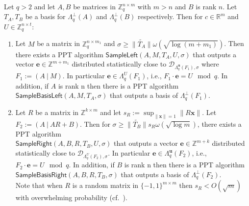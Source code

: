 \documentclass[runningheads,10pt]{llncs}
\def\ZZ{\mathbb{Z}}
\def\RR{\mathbb{R}}
\def\cal{\mathcal}
\def\bf{\mathbf}
\def\SampleLeft{\mathsf{SampleLeft}}
\def\SampleRight{\mathsf{SampleRight}}
\def\SampleBasisLeft{\mathsf{SampleBasisLeft}}
\def\SampleBasisRight{\mathsf{SampleBasisRight}}
\def\Pr{\mathrm{Pr}}
\def\u{\bf{u}}
\def\e{\bf{e}}
\def\x{\bf{x}}
\def\L{\Lambda}
\def\Lp{\Lambda^{\perp}}
\def\DuA{\cal{D}_{\L_q^{\u}(A),\sigma}}
\begin{document}
\begin{theorem}\label{thm:Gauss}
	Let $q> 2$ and let $A, B$ be matrices in $\ZZ_q^{n\times m}$ with $m>n$ and $B$ is rank $n$. Let $T_A, T_B$ be a basis for $\Lp_q(A)$ and  $\Lp_q(B)$ respectively.
	Then for $c\in\RR^m$ and $U\in\ZZ_q^{n\times t}$:
	\begin{enumerate}
		\item Let $M$ be a matrix in $\ZZ_q^{n\times m_1}$ and $\sigma\geq\|\widetilde{T_A}\|\omega(\sqrt{\log(m+m_1)})$. Then there exists a PPT algorithm $\SampleLeft(A,M,T_A,U,\sigma)$ that outputs a vector $\e\in\ZZ^{m+m_1}$ distributed statistically close to $\cal{D}_{\L_q^{\u}(F_1),\sigma}$ where $F_1:=(A~|~M)$. In particular $\e\in \L_q^{U}(F_1)$, i.e., $F_1\cdot\e=U\mod q$.
		In addition, if $A$ is rank n then there is a PPT algorithm $\SampleBasisLeft(A, M, T_A, \sigma)$ that outputs a basis of $\Lambda_q^\perp(F_1)$.\\
		
		\item Let $R$ be a matrix in $\ZZ^{k\times m}$ and let $s_R:=\sup_{\|\x\|=1}\|R\x\|$. Let $F_2:=(A~|~AR+B)$. Then for  $\sigma\geq\|\widetilde{T_B}\|s_R\omega(\sqrt{\log m})$, there exists a PPT algorithm \\$\SampleRight(A,B,R,T_B,U,\sigma)$ that outputs a vector $\e\in\ZZ^{m+k}$ distributed statistically close to $\cal{D}_{\L_q^{U}(F_2),\sigma}$. In particular $\e\in \L_q^{\u}(F_2)$, i.e., $F_2\cdot\e=U\mod q$.
		In addition, if $B$ is rank n then there is a PPT algorithm\\ $\SampleBasisRight(A, B, R, T_B,\sigma)$ that outputs a basis of $\Lambda_q^\perp(F_2)$.\\
		Note that when $R$ is a random matrix in $\{-1,1\}^{m\times m}$ then $s_R<O(\sqrt{m})$ with overwhelming probability (cf.~{\cite[Lemma 15]{ABB10-EuroCrypt}}).
	\end{enumerate}
\end{theorem}
\end{document}
